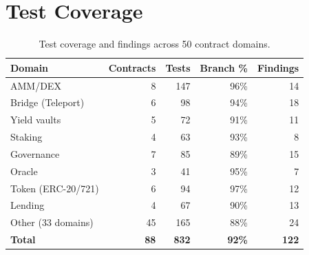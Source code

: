 \section{Test Coverage}


\begin{table}[H]
\centering
\small
\begin{tabular}{@{}lrrrr@{}}
\toprule
\textbf{Domain} & \textbf{Contracts} & \textbf{Tests} & \textbf{Branch \%} & \textbf{Findings} \\
\midrule
AMM/DEX & 8 & 147 & 96\% & 14 \\
Bridge (Teleport) & 6 & 98 & 94\% & 18 \\
Yield vaults & 5 & 72 & 91\% & 11 \\
Staking & 4 & 63 & 93\% & 8 \\
Governance & 7 & 85 & 89\% & 15 \\
Oracle & 3 & 41 & 95\% & 7 \\
Token (ERC-20/721) & 6 & 94 & 97\% & 12 \\
Lending & 4 & 67 & 90\% & 13 \\
Other (33 domains) & 45 & 165 & 88\% & 24 \\
\midrule
\textbf{Total} & \textbf{88} & \textbf{832} & \textbf{92\%} & \textbf{122} \\
\bottomrule
\end{tabular}
\caption{Test coverage and findings across 50 contract domains.}
\end{table}

